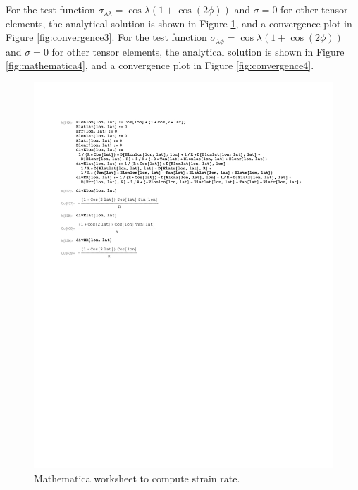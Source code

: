 \documentclass[11pt]{report}
\begin{document}
For the test function $\sigma_{\lambda\lambda}=\cos\lambda (1+\cos(2\phi))$ and $\sigma=0$ for other tensor elements, the analytical solution is shown in Figure \ref{fig:mathematica3}, and a convergence plot in Figure \ref{fig:convergence3}.  For the test function $\sigma_{\lambda\phi}=\cos\lambda (1+\cos(2\phi))$ and $\sigma=0$ for other tensor elements, the analytical solution is shown in Figure \ref{fig:mathematica4}, and a convergence plot in Figure \ref{fig:convergence4}. 


\begin{figure}[htbp]
 \center
 \includegraphics[scale=0.8, trim = 0 4in 0 0, clip]{f/130520_ELonLon_coscos.pdf}
 \caption{Mathematica worksheet to compute strain rate.}
 \label{fig:mathematica3}
\end{figure}
\end{document}
